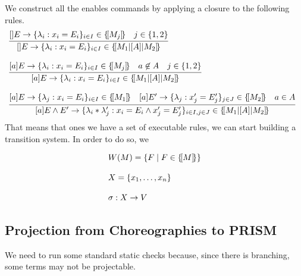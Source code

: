  We construct all the enables commands by applying a
closure to the following rules.
% 
\begin{displaymath}
  \begin{array}{lll}
    \infer[]
    {\cmd{}E{\lambda_i}{x_i}{E_i}{i\in I}\in \sem{M_1\ppp A M_2}}
    {\cmd{}E{\lambda_i}{x_i}{E_i}{i\in I}\in \sem{M_j}
    & j\in\{1,2\}}
    \\\\
    \infer[]
    {\cmd aE{\lambda_i}{x_i}{E_i}{i\in I}\in \sem{M_1\ppp A M_2}}
    {\cmd aE{\lambda_i}{x_i}{E_i}{i\in I}\in \sem{M_j}
    & a\not\in A    & j\in\{1,2\}}
    \\\\
    \infer[]
    {
    [a] E\land E' \rightarrow \{\lambda_i * \lambda_j': x_i = E_i \land x_j' = E_j' \}_{i\in I, j\in J}
    \in \sem{M_1\ppp A M_2}
    }
    {\cmd aE{\lambda_j}{x_i}{E_i}{i\in I}\in \sem{M_1}{}
    & \cmd a{E'}{\lambda_j}{x_j'}{E_j'}{j\in J}\in \sem{M_2}{}
    & a\in A}
  \end{array}
\end{displaymath}
That means that ones we have a set of executable rules, we can start
building a transition system. In order to do so, we


\begin{displaymath}
  \begin{array}{lll}
    W(M) = \{F \mid F\in\{\![M]\!\}\}
    \\\\
    X = \{x_1,\ldots,x_n\}
    \\\\
    \sigma : X \rightarrow V
  \end{array}
\end{displaymath}



\subsection{Projection from Choreographies to PRISM}
 We need to run some standard
static checks because, since there is branching, some terms may not be
projectable.
%

